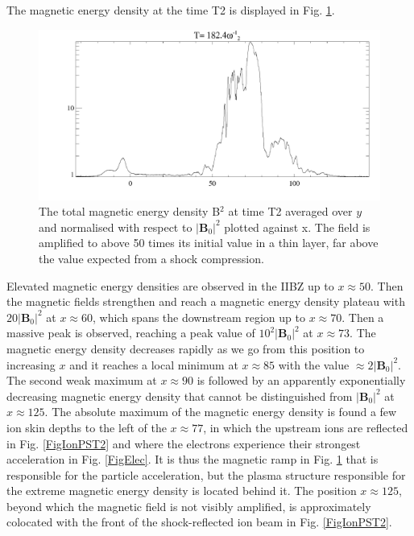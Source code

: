 \documentclass[structabstract]{aa}
\begin{document}
The magnetic energy density at the time T2 is displayed in Fig. \ref{FigFieldAmp}.
\begin{figure}
\centering
\includegraphics[width=\columnwidth]{15294f12.png}
\caption{The total magnetic energy density B$^2$ at time T2 averaged over $y$ and normalised with respect to $|{\mathbf{B}_0} |^{2}$ plotted 
against x. The field is amplified to above 50 times its initial value in a thin layer, far above the value expected 
from a shock compression.}
\label{FigFieldAmp}
\end{figure}
Elevated magnetic energy densities are observed in the IIBZ up to $x\approx 50$. Then the magnetic fields strengthen 
and reach a magnetic energy density plateau with $20{|\mathbf{B}_0|}^2$ at $x\approx 60$, which spans the downstream 
region up to $x\approx 70$. Then a massive peak is observed, reaching a peak value of $10^2 {|\mathbf{B}_0|}^2$ at 
$x\approx 73$. The magnetic energy density decreases rapidly as we go from this position to increasing $x$ and it 
reaches a local minimum at $x\approx 85$ with the value $\approx 2{|\mathbf{B}_0|}^2$. The second weak maximum at 
$x\approx 90$ is followed by an apparently exponentially decreasing magnetic energy density that cannot be 
distinguished from ${|\mathbf{B}_0|}^2$ at $x\approx 125$. The absolute maximum of the magnetic energy density is 
found a few ion skin depths to the left of the $x\approx 77$, in which the upstream ions are reflected in Fig. 
\ref{FigIonPST2} and where the electrons experience their strongest acceleration in Fig. \ref{FigElec}. It is thus 
the magnetic ramp in Fig. \ref{FigFieldAmp} that is responsible for the particle acceleration, but the plasma 
structure responsible for the extreme magnetic energy density is located behind it. The position $x\approx 125$, 
beyond which the magnetic field is not visibly amplified, is approximately colocated with the front of the 
shock-reflected ion beam in Fig. \ref{FigIonPST2}.
   
\end{document}
